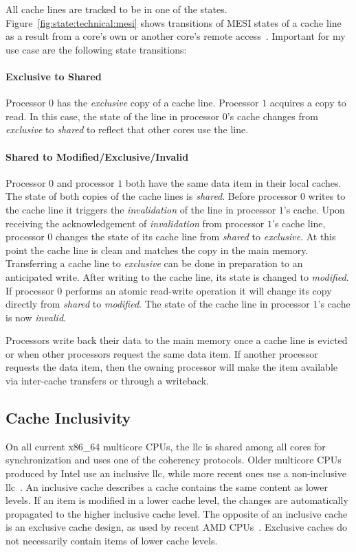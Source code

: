 All cache lines are tracked to be in one of the states.
Figure~\ref{fig:state:technical:mesi} shows transitions of MESI states of a
cache line as a result from a core's own or another core's remote
access~\cite{mckenney2010memory}. Important for my use case are the following
state transitions:

\paragraph{Exclusive to Shared}
Processor $0$ has the \textit{exclusive} copy of a cache line. Processor $1$
acquires a copy to read. In this case, the state of the line in processor $0$'s
cache changes from \textit{exclusive} to \textit{shared} to reflect that other
cores use the line.

\paragraph{Shared to Modified/Exclusive/Invalid}
Processor $0$ and processor $1$ both have the same data item in their local
caches. The state of both copies of the cache lines is \textit{shared}. Before
processor $0$ writes to the cache line it triggers the \textit{invalidation} of
the line in processor $1$'s cache. Upon receiving the acknowledgement of
\textit{invalidation} from processor $1$'s cache line, processor $0$ changes the
state of its cache line from \textit{shared} to \textit{exclusive}. At this
point the cache line is clean and matches the copy in the main memory.
Transferring a cache line to \textit{exclusive} can be done in preparation to an
anticipated write. After writing to the cache line, its state is changed to
\textit{modified}. If processor $0$ performs an atomic read-write operation it
will change its copy directly from \textit{shared} to \textit{modified}. The
state of the cache line in processor $1$'s cache is now \textit{invalid}.

Processors write back their data to the main memory once a cache line is evicted
or when other processors request the same data item. If another processor
requests the data item, then the owning processor will make the item available
via inter-cache transfers or through a writeback.

\subsection{Cache Inclusivity}
\label{sec:state:technical:caches_inclusivity}
On all current x86\_64 multicore CPUs, the \gls{llc} is shared among all cores
for synchronization and uses one of the coherency protocols. Older multicore
CPUs produced by Intel use an inclusive \gls{llc}, while more recent ones use a
non-inclusive \gls{llc}~\cite{intel_optimization, raptorlake_spec_sheet}. An
inclusive cache describes a cache contains the same content as lower levels. If
an item is modified in a lower cache level, the changes are automatically
propagated to the higher inclusive cache level. The opposite of an inclusive
cache is an exclusive cache design, as used by recent AMD
CPUs~\cite{amd_z4_optimization}. Exclusive caches do not necessarily contain
items of lower cache levels.

